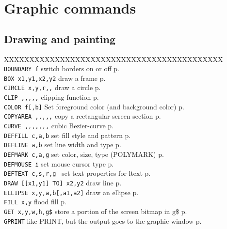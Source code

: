 \section{Graphic commands}
\subsection{Drawing and painting}
\begin{tabbing}
XXXXXXXXXXXXXXX\=XXXXXXXXXXXXXXXXXXXXXXXXXXXX\=\kill\\
\verb|BOUNDARY f| 	\> switch borders on or off\> p.\pageref{BOUNDARY}\\
\verb|BOX x1,y1,x2,y2| 	\> draw a frame\> p.\pageref{BOX}\\
\verb|CIRCLE x,y,r,,|	\> draw a circle\> p.\pageref{CIRCLE}\\
\verb|CLIP ,,,,,|  	\> clipping function\> p.\pageref{CLIP}\\
\verb|COLOR f[,b]|	\> Set foreground color (and background color)\> p.\pageref{COLOR}\\
\verb|COPYAREA ,,,,,|	\> copy a rectangular screen section \> p.\pageref{COPYAREA}\\
\verb|CURVE ,,,,,,,|  	\> cubic Bezier-curve\> p.\pageref{CURVE}\\
\verb|DEFFILL c,a,b|	\> set fill style and pattern\> p.\pageref{DEFFILL}\\
\verb|DEFLINE a,b|	\> set line width and type\> p.\pageref{DEFLINE}\\
\verb|DEFMARK c,a,g|	\> set color, size, type (POLYMARK)\> p.\pageref{DEFMARK}\\
\verb|DEFMOUSE i|	\> set mouse cursor type\> p.\pageref{DEFMOUSE}\\
\verb|DEFTEXT c,s,r,g |	\> set text properties for ltext\> p.\pageref{DEFTEXT}\\
\verb|DRAW [[x1,y1] TO] x2,y2| \> draw line\> p.\pageref{DRAW}\\
\verb|ELLIPSE x,y,a,b[,a1,a2]| \> draw an ellipse\> p.\pageref{ELLIPSE}\\
\verb|FILL x,y|  	\> flood fill \> p.\pageref{FILL}\\
\verb|GET x,y,w,h,g$|  	\>  store a portion of the screen bitmap in  g\$\> p.\pageref{GET}\\
\verb|GPRINT|  		\>  like PRINT, but the output goes to the graphic window\> p.\pageref{GPRINT}\\


\end{tabbing}
